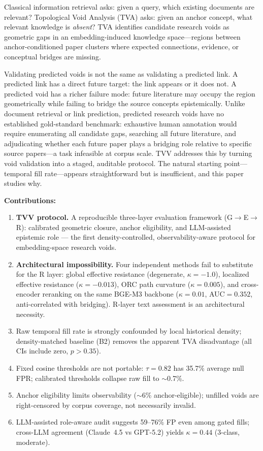 \documentclass[11pt,twocolumn]{article}
\newcommand{\tva}{\textsf{TVA}}
\begin{document}
Classical information retrieval asks: given a query, which existing documents are
relevant? Topological Void Analysis (\tva{}) asks: given an anchor concept, what
relevant knowledge is \emph{absent}?
\tva{} identifies candidate research voids as geometric gaps in an embedding-induced
knowledge space---regions between anchor-conditioned paper clusters where expected
connections, evidence, or conceptual bridges are missing.

Validating predicted voids is not the same as validating a predicted link.
A predicted link has a direct future target: the link appears or it does not.
A predicted void has a richer failure mode: future literature may occupy the region
geometrically while failing to bridge the source concepts epistemically.
Unlike document retrieval or link prediction, predicted research voids have no
established gold-standard benchmark: exhaustive human annotation would require
enumerating all candidate gaps, searching all future literature, and adjudicating
whether each future paper plays a bridging role relative to specific source papers---a
task infeasible at corpus scale. TVV addresses this by turning void validation into a
staged, auditable protocol. The natural starting point---temporal fill rate---appears
straightforward but is insufficient, and this paper studies why.

\textbf{Contributions:}
\begin{enumerate}
\item \textbf{TVV protocol.} A reproducible three-layer evaluation framework
  (G$\to$E$\to$R): calibrated geometric closure, anchor eligibility, and LLM-assisted
  epistemic role --- the first density-controlled, observability-aware protocol for
  embedding-space research voids.
\item \textbf{Architectural impossibility.} Four independent methods fail to substitute
  for the R layer: global effective resistance (degenerate, $\kappa{=}-1.0$), localized
  effective resistance ($\kappa{=}-0.013$), ORC path curvature ($\kappa{=}0.005$), and
  cross-encoder reranking on the same BGE-M3 backbone ($\kappa{=}0.01$, AUC$=0.352$,
  anti-correlated with bridging). R-layer text assessment is an architectural necessity.
\item Raw temporal fill rate is strongly confounded by local historical density;
  density-matched baseline (B2) removes the apparent TVA disadvantage (all CIs include
  zero, $p>0.35$).
\item Fixed cosine thresholds are not portable: $\tau{=}0.82$ has 35.7\% average null
  FPR; calibrated thresholds collapse raw fill to $\sim$0.7\%.
\item Anchor eligibility limits observability ($\sim$6\% anchor-eligible); unfilled
  voids are right-censored by corpus coverage, not necessarily invalid.
\item LLM-assisted role-aware audit suggests 59--76\% FP even among gated fills;
  cross-LLM agreement (Claude~4.5 vs GPT-5.2) yields $\kappa{=}0.44$ (3-class,
  moderate).
\end{enumerate}
\end{document}
